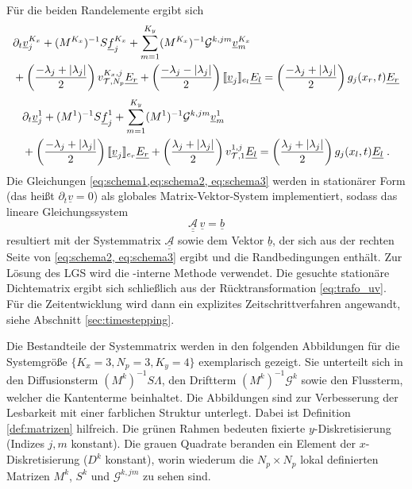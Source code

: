 Für die beiden Randelemente ergibt sich
\begin{equation}
  \begin{aligned}
      &\partial_t \underline{v}_j^{K_x} + (M^{K_x})^{-1}S \underline{f}_j^{K_x} + \sum_{m=1}^{K_y} (M^{K_x})^{-1}\mathcal{G}^{k,jm}\underline{v}_m^{K_x} \\
      &+ \left(\frac{-\lambda_j + |\lambda_j|}{2}\right) v_{\mathcal{T},N_p}^{K_x,j} \underline{E_r} +
         \left(\frac{-\lambda_j - |\lambda_j|}{2}\right) \llbracket \underline{v}_j \rrbracket_{e_l}\underline{E_l} =
         \left(\frac{-\lambda_j + |\lambda_j|}{2}\right) g_j(x_r,t)\underline{E_r}
  \end{aligned}
  \label{eq:schema2}
\end{equation}
\begin{equation}
  \begin{aligned}
      &\partial_t \underline{v}_j^{1} + (M^{1})^{-1}S \underline{f}_j^{1} + \sum_{m=1}^{K_y} (M^{1})^{-1}\mathcal{G}^{k,jm}\underline{v}_m^{1} \\
        &+ \left(\frac{-\lambda_j + |\lambda_j|}{2}\right) \llbracket \underline{v}_j \rrbracket_{e_r}\underline{E_r} +
           \left(\frac{\lambda_j + |\lambda_j|}{2}\right) v_{\mathcal{T},1}^{1,j} \underline{E_l}
        =\left(\frac{\lambda_j + |\lambda_j|}{2}\right) g_j(x_l,t)\underline{E_l} \; .
  \end{aligned}
  \label{eq:schema3}
\end{equation}
Die Gleichungen \eqref{eq:schema1,eq:schema2, eq:schema3} werden in stationärer Form (das heißt $\partial_t \underline{v}=0$) als globales Matrix-Vektor-System implementiert, sodass das lineare Gleichungssystem
\begin{equation}
  \underline{\underline{\mathcal{A}}}\,\underline{v} = \underline{b}
  \label{eq:stat_LGS}
\end{equation}
resultiert mit der Systemmatrix $\underline{\underline{\mathcal{A}}}$ sowie dem Vektor $\underline{b}$, der sich aus der rechten Seite von \eqref{eq:schema2, eq:schema3} ergibt und die Randbedingungen enthält. Zur Lösung des LGS wird die \mat-interne Methode verwendet. Die gesuchte stationäre Dichtematrix ergibt sich schließlich aus der Rücktransformation \eqref{eq:trafo_uv}. Für die Zeitentwicklung wird dann ein explizites Zeitschrittverfahren angewandt, siehe Abschnitt \ref{sec:timestepping}.

Die Bestandteile der Systemmatrix werden in den folgenden Abbildungen für die Systemgröße $\{K_x=3, N_p=3, K_y=4\}$ exemplarisch gezeigt. Sie unterteilt sich in den Diffusionsterm $(M^k)^{-1}S\Lambda$, den Driftterm $(M^k)^{-1}\mathcal{G}^k$ sowie den Flussterm, welcher die Kantenterme beinhaltet. Die Abbildungen sind zur Verbesserung der Lesbarkeit mit einer farblichen Struktur unterlegt. Dabei ist Definition \ref{def:matrizen} hilfreich. Die grünen Rahmen bedeuten fixierte $y$-Diskretisierung (Indizes $j,m$ konstant). Die grauen Quadrate beranden ein Element der $x$-Diskretisierung ($D^k$ konstant), worin wiederum die $N_p \times N_p$ lokal definierten Matrizen $M^k$, $S^k$ und $\mathcal{G}^{k,jm}$ zu sehen sind.

